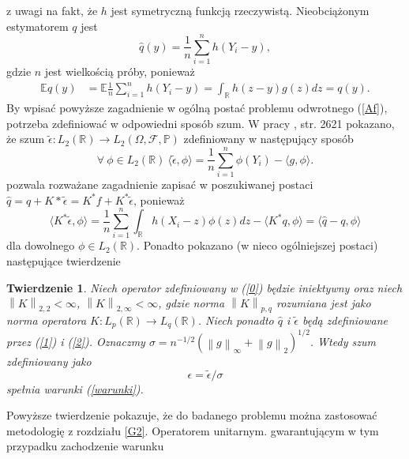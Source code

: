 \documentclass[man,mfiu]{mgrwms}
\newcommand{\norm}[1]{\left\lVert#1\right\rVert}
\newtheorem{tw}{Twierdzenie}[chapter]
\begin{document}
z uwagi na fakt, że $h$ jest symetryczną funkcją rzeczywistą. Nieobciążonym estymatorem $q$ jest
\begin{equation}\label{1}
\hat{q}(y)=\frac{1}{n}\sum_{i=1}^nh\left(Y_i-y\right),
\end{equation}
gdzie $n$ jest wielkością próby, ponieważ
\begin{displaymath}
\begin{split}
\mathbb{E}\hat{q}(y)&=\mathbb{E}\frac{1}{n}\sum_{i=1}^nh\left(Y_i-y\right)=\int_{\mathbb{R}}h(z-y)g(z)dz = q(y).
\end{split}
\end{displaymath} 
By wpisać powyższe zagadnienie w ogólną postać problemu odwrotnego (\ref{Af}), potrzeba zdefiniować w odpowiedni sposób szum. W pracy \cite{bissantz}, str. 2621 pokazano, że szum $\tilde{\epsilon}\colon L_2(\mathbb{R})\to L_2(\Omega,\mathcal{F},\mathbb{P})$ zdefiniowany w następujący sposób 
\begin{equation}\label{2}
\forall\ \phi\in L_2(\mathbb{R})\ \langle \tilde{\epsilon},\phi \rangle=\frac{1}{n}\sum_{i=1}^n\phi(Y_i)-\langle g,\phi\rangle.
\end{equation}
pozwala rozważane zagadnienie zapisać w poszukiwanej postaci $\hat{q}= q+ K*\tilde{\epsilon}=K^*f +K^*\tilde{\epsilon}$, ponieważ
\begin{displaymath}
\langle K^*\tilde{\epsilon},\phi\rangle = \frac{1}{n}\sum_{i=1}^n\int_{\mathbb{R}}h(X_i-z)\phi(z)dz-\langle K^*q,\phi\rangle = \langle \hat{q}-q,\phi\rangle
\end{displaymath}
dla dowolnego $\phi \in L_2(\mathbb{R})$. Ponadto pokazano (w nieco ogólniejszej postaci) następujące twierdzenie
\begin{tw}
Niech operator zdefiniowany w (\ref{0}) będzie iniektywny oraz niech $\norm{K}_{2,2}<\infty$, $\norm{K}_{2,\infty}<\infty$, gdzie norma $\norm{K}_{p,q}$ rozumiana jest jako norma operatora $K\colon L_p(\mathbb{R})\to L_q(\mathbb{R})$. Niech ponadto $\hat{q}$ i $\tilde{\epsilon}$ będą zdefiniowane przez (\ref{1}) i (\ref{2}). Oznaczmy $\sigma=n^{-1/2}\left(\norm{g}_{\infty}+\norm{g}_2\right)^{1/2}$. Wtedy szum zdefiniowany jako
\begin{displaymath}
\epsilon=\tilde{\epsilon}/\sigma
\end{displaymath}
spełnia warunki (\ref{warunki}).
\end{tw}
Powyższe twierdzenie pokazuje, że do badanego problemu można zastosować metodologię z rozdziału \ref{G2}. Operatorem unitarnym. gwarantującym w tym przypadku zachodzenie warunku 
\end{document}
